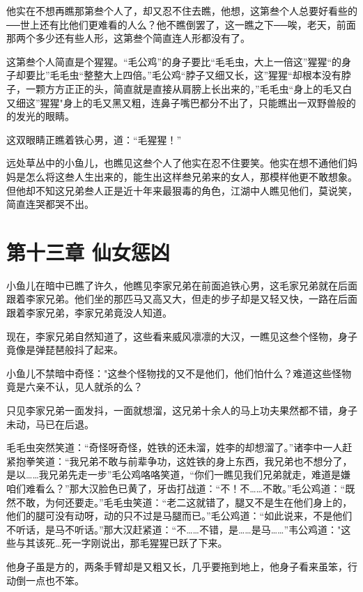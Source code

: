 \documentclass[12pt,oneside]{book}
\begin{document}
他实在不想再瞧那第叁个人了，却又忍不住去瞧，他想，这第叁个人总要好看些的──世上还有比他们更难看的人么？他不瞧倒罢了，这一瞧之下──唉，老天，前面那两个多少还有些人形，这第叁个简直连人形都没有了。

这第叁个人简直是个猩猩。``毛公鸡''的身子要比``毛毛虫，大上一倍这''猩猩``的身子却要比''毛毛虫``整整大上四倍。''毛公鸡``脖子又细又长，这''猩猩``却根本没有脖子，一颗方方正正的头，简直就是直接从肩膀上长出来的，''毛毛虫``身上的毛又白又细这''猩猩"身上的毛又黑又粗，连鼻子嘴巴都分不出了，只能瞧出一双野兽般的的发光的眼睛。

这双眼睛正瞧着铁心男，道：``毛猩猩！''

远处草丛中的小鱼儿，也瞧见这叁个人了他实在忍不住要笑。他实在想不通他们妈妈是怎么将这叁人生出来的，能生出这样叁兄弟来的女人，那模样他更不敢想象。但他却不知这兄弟叁人正是近十年来最狠毒的角色，江湖中人瞧见他们，莫说笑，简直连哭都哭不出。

\hypertarget{ux7b2cux5341ux4e09ux7ae0-ux4ed9ux5973ux60e9ux51f6}{%
\chapter{第十三章
仙女惩凶}\label{ux7b2cux5341ux4e09ux7ae0-ux4ed9ux5973ux60e9ux51f6}}

小鱼儿在暗中已瞧了许久，他瞧见李家兄弟在前面追铁心男，这毛家兄弟就在后面跟着李家兄弟。他们坐的那匹马又高又大，但走的步子却是又轻又快，一路在后面跟着李家兄弟，李家兄弟竟没人知道。

现在，李家兄弟自然知道了，这些看来威风凛凛的大汉，一瞧见这叁个怪物，身子竟像是弹琵琶般抖了起来。

小鱼儿不禁暗中奇怪："这叁个怪物找的又不是他们，他们怕什么？难道这些怪物竟是六亲不认，见人就杀的么？

只见李家兄弟一面发抖，一面就想溜，这兄弟十余人的马上功夫果然都不错，身子未动，马已在后退。

毛毛虫突然笑道：``奇怪呀奇怪，姓铁的还未溜，姓李的却想溜了。''诸李中一人赶紧抱拳笑道：``我兄弟不敢与前辈争功，这姓铁的身上东西，我兄弟也不想分了，是以\ldots\ldots 我兄弟先走一步''毛公鸡咯咯笑道，``你们一瞧见我们兄弟就走，难道是嫌咱们难看么？''那大汉脸色已黄了，牙齿打战道：``不！不\ldots\ldots 不敢。''毛公鸡道：``既然不敢，为何还要走。''毛毛虫笑道：``老二这就错了，腿又不是生在他们身上的，他们的腿可没有动呀，动的只不过是马腿而已。''毛公鸡道：``如此说来，不是他们不听话，是马不听话。''那大汉赶紧道：``不\ldots\ldots 不错，是\ldots\ldots 是马\ldots\ldots{}''韦公鸡道："这些与其该死\ldots 死一字刚说出，那毛猩猩已跃了下来。

他身子虽是方的，两条手臂却是又粗又长，几乎要拖到地上，他身子看来虽笨，行动倒一点也不笨。
\end{document}
